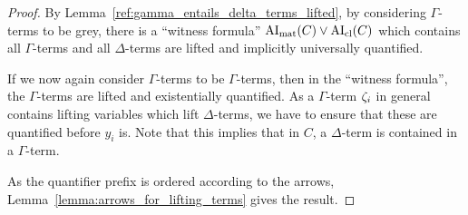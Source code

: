 \documentclass[,%
	paper=a4,%
	DIV10, %
	twoside=false,%
	liststotoc,
	bibtotoc,
	draft=false,%
	numbers=noendperiod
]{scrartcl}
\begin{document}
\begin{proof}
\begin{comment}
				$\Gamma \entails Q_1' z_1' \dots Q_{m'}' z_{m'}' \Big( \AImatrix(C_2) \lor \clauseTwoPrime \lor {\lnot (l{\fromclause'})_\Gamma} \Big)$
				\bigskip


				By the previous proof:

				$\Gamma \stackrel{\markA}\entails Q_1 z_1 \dots Q_m z_m \Big(\lifboth{\AImatrix(C_1)\sigma}\tau \lor \lifboth{\clauseOnePrime\sigma}\tau \lor \lifboth{(l{\fromclause})_\Gamma\sigma}\tau \Big)$

				$\Gamma \stackrel{\markB}\entails Q_1' z_1' \dots Q_{m'}' z_{m'}' \Big(  \lifboth{\AImatrix(C_2)\sigma}\tau \lor \lifboth{\clauseTwoPrime\sigma}\tau \lor \lnot \lifboth{(l{\fromclause'})_\Gamma\sigma}\tau \Big)$

		\end{description}
	\end{comment}

	By Lemma~\ref{ref:gamma_entails_delta_terms_lifted}, by considering $\Gamma$-terms to be grey, there is a ``witness formula'' 
	$\operatorname{AI}_\mathrm{mat}(C) \lor \operatorname{AI}_\mathrm{cl}(C)$ which contains all $\Gamma$-terms and all $\Delta$-terms are lifted and implicitly universally quantified.

	If we now again consider $\Gamma$-terms to be $\Gamma$-terms, then in the ``witness formula'', the $\Gamma$-terms are lifted and existentially quantified.
	As a $\Gamma$-term $\zeta_{i}$ in general contains lifting variables which lift $\Delta$-terms, we have to ensure that these are quantified before $y_i$ is.
	Note that this implies that in $C$, a $\Delta$-term is contained in a $\Gamma$-term.

	As the quantifier prefix is ordered according to the arrows, Lemma~\ref{lemma:arrows_for_lifting_terms} gives the result. 
\end{proof}
\end{document}
